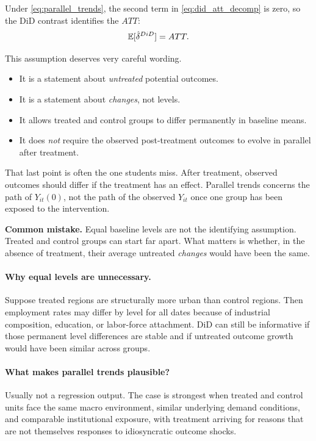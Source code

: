 Under \eqref{eq:parallel_trends}, the second term in \eqref{eq:did_att_decomp} is zero, so the \ac{DiD} contrast identifies the $ATT$:
\[
\mathbb{E}[\hat{\delta}^{DiD}] = ATT.
\]

This assumption deserves very careful wording.
\begin{itemize}
\item It is a statement about \emph{untreated} potential outcomes.
\item It is a statement about \emph{changes}, not levels.
\item It allows treated and control groups to differ permanently in baseline means.
\item It does \emph{not} require the observed post-treatment outcomes to evolve in parallel after treatment.
\end{itemize}

That last point is often the one students miss. After treatment, observed outcomes should differ if the treatment has an effect. Parallel trends concerns the path of $Y_{it}(0)$, not the path of the observed $Y_{it}$ once one group has been exposed to the intervention.

\begin{boxF}
\textbf{Common mistake.}
Equal baseline levels are not the identifying assumption. Treated and control groups can start far apart. What matters is whether, in the absence of treatment, their average untreated \emph{changes} would have been the same.
\end{boxF}

\paragraph{Why equal levels are unnecessary.}
Suppose treated regions are structurally more urban than control regions. Then employment rates may differ by level for all dates because of industrial composition, education, or labor-force attachment. \ac{DiD} can still be informative if those permanent level differences are stable and if untreated outcome growth would have been similar across groups.

\paragraph{What makes parallel trends plausible?}
Usually not a regression output. The case is strongest when treated and control units face the same macro environment, similar underlying demand conditions, and comparable institutional exposure, with treatment arriving for reasons that are not themselves responses to idiosyncratic outcome shocks.

